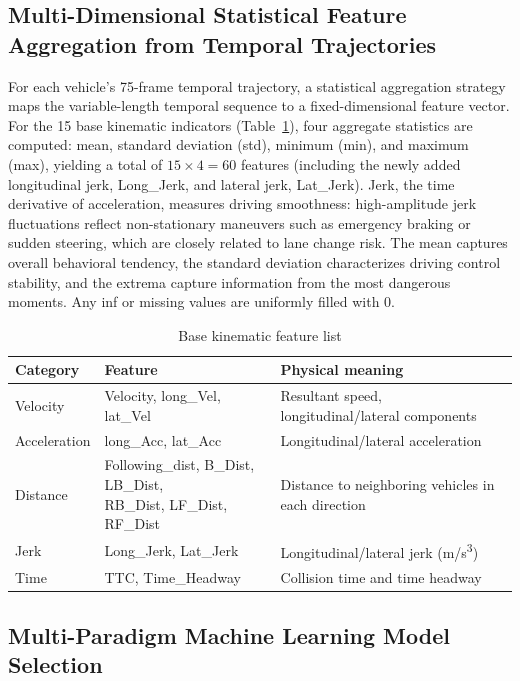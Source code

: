 \documentclass[preprint,review,12pt,a4paper]{elsarticle}
\begin{document}
\subsection{Multi-Dimensional Statistical Feature Aggregation from Temporal Trajectories}

For each vehicle's 75-frame temporal trajectory, a statistical aggregation strategy maps the variable-length temporal sequence to a fixed-dimensional feature vector. For the 15 base kinematic indicators (Table~\ref{tab:features}), four aggregate statistics are computed: mean, standard deviation (std), minimum (min), and maximum (max), yielding a total of $15 \times 4 = 60$ features (including the newly added longitudinal jerk, Long\_Jerk, and lateral jerk, Lat\_Jerk). Jerk, the time derivative of acceleration, measures driving smoothness: high-amplitude jerk fluctuations reflect non-stationary maneuvers such as emergency braking or sudden steering, which are closely related to lane change risk. The mean captures overall behavioral tendency, the standard deviation characterizes driving control stability, and the extrema capture information from the most dangerous moments. Any inf or missing values are uniformly filled with 0.

\begin{table}[H]
\centering
\caption{Base kinematic feature list}
\label{tab:features}
\small
\begin{tabular}{llp{6cm}}
\toprule
Category & Feature & Physical meaning \\
\midrule
Velocity & Velocity, long\_Vel, lat\_Vel & Resultant speed, longitudinal/lateral components \\
Acceleration & long\_Acc, lat\_Acc & Longitudinal/lateral acceleration \\
Distance & \makecell[l]{Following\_dist, B\_Dist, LB\_Dist, \\ RB\_Dist, LF\_Dist, RF\_Dist} & Distance to neighboring vehicles in each direction \\
Jerk & Long\_Jerk, Lat\_Jerk & Longitudinal/lateral jerk (m/s\textsuperscript{3}) \\
Time & TTC, Time\_Headway & Collision time and time headway \\
\bottomrule
\end{tabular}
\end{table}

\subsection{Multi-Paradigm Machine Learning Model Selection}
\end{document}
